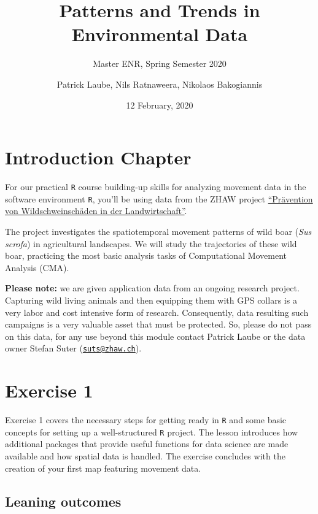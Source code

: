 \documentclass[]{book}
\title{Patterns and Trends in Environmental Data}
\subtitle{Master ENR, Spring Semester 2020}
\author{Patrick Laube, Nils Ratnaweera, Nikolaos Bakogiannis}
\date{12 February, 2020}
\begin{document}
\maketitle

{
\setcounter{tocdepth}{1}
\tableofcontents
}
\hypertarget{introduction-chapter}{%
\chapter*{Introduction Chapter}\label{introduction-chapter}}

For our practical \texttt{R} course building-up skills for analyzing movement data in the software environment \texttt{R}, you'll be using data from the ZHAW project \href{https://www.zhaw.ch/de/lsfm/institute-zentren/iunr/integrative-oekologie/wildtiermanagement/referenzprojekte/}{``Prävention von Wildschweinschäden in der Landwirtschaft''}.

The project investigates the spatiotemporal movement patterns of wild boar (\emph{Sus scrofa}) in agricultural landscapes. We will study the trajectories of these wild boar, practicing the most basic analysis tasks of Computational Movement Analysis (CMA).

\textbf{Please note:} we are given application data from an ongoing research project. Capturing wild living animals and then equipping them with GPS collars is a very labor and cost intensive form of research. Consequently, data resulting such campaigns is a very valuable asset that must be protected. So, please do not pass on this data, for any use beyond this module contact Patrick Laube or the data owner Stefan Suter (\href{mailto:suts@zhaw.ch}{\nolinkurl{suts@zhaw.ch}}).

\hypertarget{exercise-1}{%
\chapter{Exercise 1}\label{exercise-1}}

Exercise 1 covers the necessary steps for getting ready in \texttt{R} and some basic concepts for setting up a well-structured \texttt{R} project. The lesson introduces how additional packages that provide useful functions for data science are made available and how spatial data is handled. The exercise concludes with the creation of your first map featuring movement data.

\hypertarget{leaning-outcomes}{%
\section{Leaning outcomes}\label{leaning-outcomes}}
\end{document}
